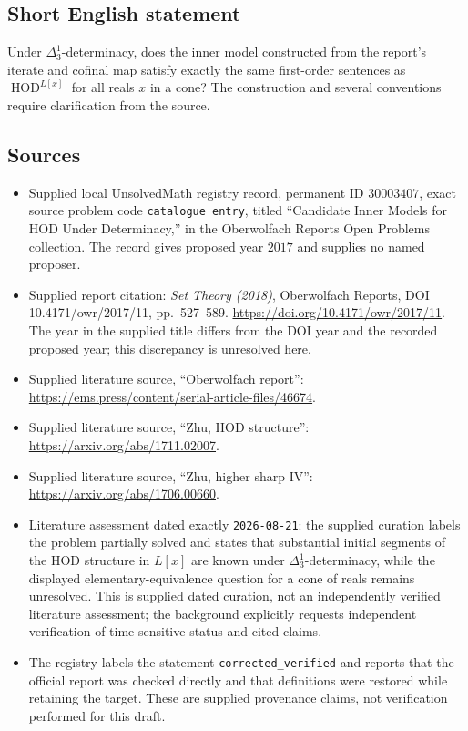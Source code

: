 \documentclass[11pt]{article}
\begin{document}
\subsection{Short English statement}
Under $\Delta^1_3$-determinacy, does the inner model constructed from the report's iterate and cofinal map satisfy exactly the same first-order sentences as $\operatorname{HOD}^{L[x]}$ for all reals $x$ in a cone? The construction and several conventions require clarification from the source.
\subsection{Sources}
\begin{itemize}
\item Supplied local UnsolvedMath registry record, permanent ID $30003407$, exact source problem code \texttt{catalogue entry}, titled ``Candidate Inner Models for HOD Under Determinacy,'' in the Oberwolfach Reports Open Problems collection. The record gives proposed year $2017$ and supplies no named proposer.
\item Supplied report citation: \emph{Set Theory (2018)}, Oberwolfach Reports, DOI 10.4171/owr/2017/11, pp.~527--589. \url{https://doi.org/10.4171/owr/2017/11}. The year in the supplied title differs from the DOI year and the recorded proposed year; this discrepancy is unresolved here.
\item Supplied literature source, ``Oberwolfach report'': \url{https://ems.press/content/serial-article-files/46674}.
\item Supplied literature source, ``Zhu, HOD structure'': \url{https://arxiv.org/abs/1711.02007}.
\item Supplied literature source, ``Zhu, higher sharp IV'': \url{https://arxiv.org/abs/1706.00660}.
\item Literature assessment dated exactly \texttt{2026-08-21}: the supplied curation labels the problem partially solved and states that substantial initial segments of the HOD structure in $L[x]$ are known under $\Delta^1_3$-determinacy, while the displayed elementary-equivalence question for a cone of reals remains unresolved. This is supplied dated curation, not an independently verified literature assessment; the background explicitly requests independent verification of time-sensitive status and cited claims.
\item The registry labels the statement \texttt{corrected\_verified} and reports that the official report was checked directly and that definitions were restored while retaining the target. These are supplied provenance claims, not verification performed for this draft.
\end{itemize}
\end{document}
